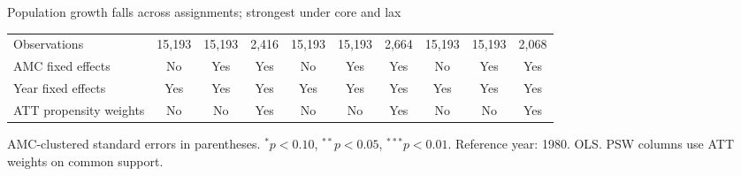 \documentclass[aspectratio=169]{beamer}
\begin{document}
\begin{frame}{Population growth falls across assignments; strongest under core and lax}
{\begin{tabular}{@{}l*{9}{c}@{}}
\midrule
Observations & 15,193 & 15,193 & 2,416 & 15,193 & 15,193 & 2,664 & 15,193 & 15,193 & 2,068 \\
AMC fixed effects & No & Yes & Yes & No & Yes & Yes & No & Yes & Yes \\
Year fixed effects & Yes & Yes & Yes & Yes & Yes & Yes & Yes & Yes & Yes \\
ATT propensity weights & No & No & Yes & No & No & Yes & No & No & Yes \\
\bottomrule
\end{tabular}%
}
\vspace{0.1em}
{\tiny\color{ZMidGray} AMC-clustered standard errors in parentheses. $^{*}p<0.10$, $^{**}p<0.05$, $^{***}p<0.01$. Reference year: 1980. OLS. PSW columns use ATT weights on common support.}
\end{frame}
\end{document}
